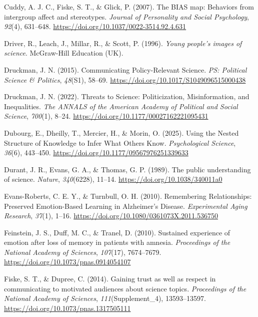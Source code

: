 \documentclass[
  jou,
  floatsintext,
  longtable,
  nolmodern,
  notxfonts,
  notimes,
  colorlinks=true,linkcolor=blue,citecolor=blue,urlcolor=blue]{apa7}
\newlength{\cslhangindent}
\newenvironment{CSLReferences}[2] %
 {\begin{list}{}{%
  \setlength{\itemindent}{0pt}
  \setlength{\leftmargin}{0pt}
  \setlength{\parsep}{0pt}
  \ifodd #1
   \setlength{\leftmargin}{\cslhangindent}
   \setlength{\itemindent}{-1\cslhangindent}
  \fi
  \setlength{\itemsep}{#2\baselineskip}}}
 {\end{list}}
\begin{document}
\begin{CSLReferences}{1}{0}
Cuddy, A. J. C., Fiske, S. T., \& Glick, P. (2007). The BIAS map:
Behaviors from intergroup affect and stereotypes. \emph{Journal of
Personality and Social Psychology}, \emph{92}(4), 631--648.
\url{https://doi.org/10.1037/0022-3514.92.4.631}

Driver, R., Leach, J., Millar, R., \& Scott, P. (1996). \emph{Young
people's images of science}. McGraw-Hill Education (UK).

Druckman, J. N. (2015). Communicating Policy-Relevant Science. \emph{PS:
Political Science \& Politics}, \emph{48}(S1), 58--69.
\url{https://doi.org/10.1017/S1049096515000438}

Druckman, J. N. (2022). Threats to Science: Politicization,
Misinformation, and Inequalities. \emph{The ANNALS of the American
Academy of Political and Social Science}, \emph{700}(1), 8--24.
\url{https://doi.org/10.1177/00027162221095431}

Dubourg, E., Dheilly, T., Mercier, H., \& Morin, O. (2025). Using the
Nested Structure of Knowledge to Infer What Others Know.
\emph{Psychological Science}, \emph{36}(6), 443--450.
\url{https://doi.org/10.1177/09567976251339633}

Durant, J. R., Evans, G. A., \& Thomas, G. P. (1989). The public
understanding of science. \emph{Nature}, \emph{340}(6228), 11--14.
\url{https://doi.org/10.1038/340011a0}

Evans-Roberts, C. E. Y., \& Turnbull, O. H. (2010). Remembering
Relationships: Preserved Emotion-Based Learning in Alzheimer's Disease.
\emph{Experimental Aging Research}, \emph{37}(1), 1--16.
\url{https://doi.org/10.1080/0361073X.2011.536750}

Feinstein, J. S., Duff, M. C., \& Tranel, D. (2010). Sustained
experience of emotion after loss of memory in patients with amnesia.
\emph{Proceedings of the National Academy of Sciences}, \emph{107}(17),
7674--7679. \url{https://doi.org/10.1073/pnas.0914054107}

Fiske, S. T., \& Dupree, C. (2014). Gaining trust as well as respect in
communicating to motivated audiences about science topics.
\emph{Proceedings of the National Academy of Sciences},
\emph{111}(Supplement{\_}4), 13593--13597.
\url{https://doi.org/10.1073/pnas.1317505111}


\end{CSLReferences}
\end{document}
